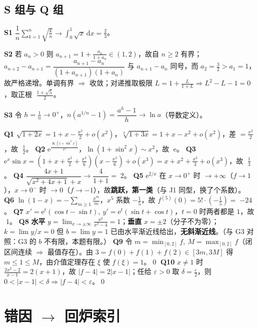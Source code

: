 \documentclass[11pt,a4paper]{ctexart}
\newcommand{\eps}{\varepsilon}
\newcommand{\abs}[1]{\left\lvert #1\right\rvert}
\newcommand{\ee}{\mathrm{e}}
\newcommand{\D}{\mathrm{d}}
\newcommand{\ans}[1]{\;\boxed{#1}}
\begin{document}
\subsection{S 组与 Q 组}

\textbf{S1} $\dfrac1n\sum_{k=1}^n\sqrt{\frac kn}\to\displaystyle\int_0^1\sqrt x\,\D x=\frac23$。\ans{\frac23}

\textbf{S2} 若 $a_n>0$ 则 $a_{n+1}=1+\frac{a_n}{1+a_n}\in(1,2)$，故自 $n\geq2$ 有界；$a_{n+2}-a_{n+1}=\dfrac{a_{n+1}-a_n}{(1+a_{n+1})(1+a_n)}$ 与 $a_{n+1}-a_n$ 同号，而 $a_2=\frac32>a_1=1$，故严格递增。单调有界 $\Rightarrow$ 收敛；对递推取极限 $L=1+\frac{L}{1+L}\Rightarrow L^2-L-1=0$，取正根 $\ans{\frac{1+\sqrt5}2}$。

\textbf{S3} 令 $h=\frac1n\to0^+$，$n(a^{1/n}-1)=\dfrac{a^h-1}{h}\to\ln a$（导数定义）。\ans{\ln a}

\textbf{Q1} $\sqrt{1+2x}=1+x-\frac{x^2}2+o(x^2)$，$\sqrt[3]{1+3x}=1+x-x^2+o(x^2)$，差 $=\frac{x^2}2$，故 $\ans{\frac12}$。
\textbf{Q2} $\ee^{\frac{\ln(1+\sin^2x)}{x^2}}$，$\ln(1+\sin^2x)\sim x^2$，故 $\ans{\ee}$。
\textbf{Q3} $\ee^x\sin x=\left(1+x+\frac{x^2}2+\frac{x^3}6\right)\left(x-\frac{x^3}6\right)+o(x^3)=x+x^2+\frac{x^3}3+o(x^3)$，故 $\ans{\frac13}$。
\textbf{Q4} $\dfrac{4x+1}{\sqrt{x^2+4x+1}+x}\to\dfrac4{1+1}=\ans{2}$。
\textbf{Q5} $\ee^{2/x}$ 在 $x\to0^+$ 时 $\to+\infty$（$f\to1$），$x\to0^-$ 时 $\to0$（$f\to-1$），故\textbf{跳跃，第一类}（与 J1 同型，换了个系数）。
\textbf{Q6} $\ln(1-x)=-\sum_{m\geq1}\frac{x^m}{m}$，$x^5$ 系数 $-\frac15$，故 $f^{(5)}(0)=5!\cdot\left(-\frac15\right)=\ans{-24}$。
\textbf{Q7} $x'=\ee^t(\cos t-\sin t),\ y'=\ee^t(\sin t+\cos t)$，$t=0$ 时两者都是 $1$，故 $\ans{1}$。
\textbf{Q8} \textbf{水平} $y=\lim_{x\to\pm\infty}\frac{x^2}{x^2-4}=1$；\textbf{垂直} $x=\pm2$（分子不为零）；$k=\lim y/x=0$ 但 $b=\lim y=1$ 已由水平渐近线给出，\textbf{无斜渐近线}。（与 G3 对照：G3 的 $b$ 不有限，本题有限。）
\textbf{Q9} 令 $m=\min_{[0,2]}f,\ M=\max_{[0,2]}f$（闭区间连续 $\Rightarrow$ 最值存在）。由 $3=f(0)+f(1)+f(2)\in[3m,3M]$ 得 $m\leq1\leq M$，由介值定理存在 $\xi$ 使 $f(\xi)=1$。\qed
\textbf{Q10} $x\ne1$ 时 $\frac{2x^2-2}{x-1}=2(x+1)$，故 $\abs{f-4}=2\abs{x-1}$；任给 $\eps>0$ 取 $\delta=\frac\eps2$，则 $0<\abs{x-1}<\delta\Rightarrow\abs{f-4}<\eps$。\qed

\section{错因 $\to$ 回炉索引}
\end{document}
